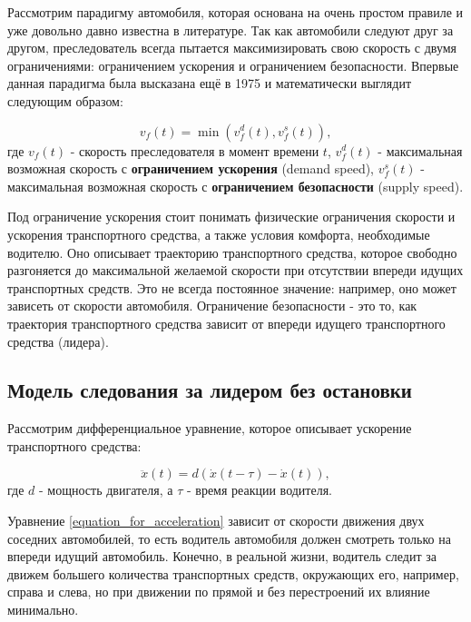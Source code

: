 \documentclass[12pt, a4paper]{extarticle}
\numberwithin{equation}{section}
\begin{document}
Рассмотрим парадигму автомобиля, которая основана на очень простом правиле и уже довольно давно известна в литературе. Так как автомобили следуют друг за другом, преследователь всегда пытается максимизировать свою скорость с двумя ограничениями: ограничением ускорения и ограничением безопасности. Впервые данная парадигма была высказана ещё в 1975 \cite{GippsModel} и математически выглядит следующим образом:

\begin{equation} \label{following_paradigm}
v_f(t) = \min(v_f^d(t), v_f^s(t)),
\end{equation}
где $v_f(t)$ - скорость преследователя в момент времени $t$, $v_f^d(t)$ - максимальная возможная скорость с \textbf{ограничением ускорения} (demand speed), $v_f^s(t)$ - максимальная возможная скорость с \textbf{ограничением безопасности} (supply speed).

Под ограничение ускорения стоит понимать физические ограничения скорости и ускорения транспортного средства, а также условия комфорта, необходимые водителю. Оно описывает траекторию транспортного средства, которое свободно разгоняется до максимальной желаемой скорости при отсутствии впереди идущих транспортных средств. Это не всегда постоянное значение: например, оно может зависеть от скорости автомобиля. Ограничение безопасности - это то, как траектория транспортного средства зависит от впереди идущего транспортного средства (лидера).


\subsection{Модель следования за лидером без остановки}

Рассмотрим дифференциальное уравнение, которое описывает ускорение транспортного средства:

\begin{equation} \label{equation_for_acceleration}
\ddot{x}(t) = d (\dot{x}(t-\tau)-\dot{x}(t)),
\end{equation}
где $d$ - мощность двигателя, а $\tau$ - время реакции водителя.

Уравнение \eqref{equation_for_acceleration} зависит от скорости движения двух соседних автомобилей, то есть водитель автомобиля должен смотреть только на впереди идущий автомобиль. Конечно, в реальной жизни, водитель следит за движем большего количества транспортных средств, окружающих его, например, справа и слева, но при движении по прямой и без перестроений их влияние минимально.
\end{document}

